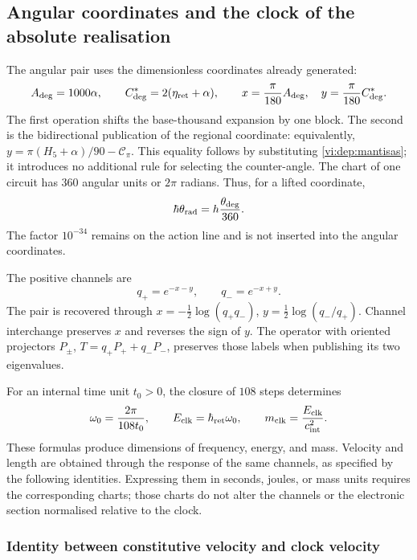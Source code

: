 \subsection{Angular coordinates and the clock of the absolute realisation}
\label{vi:dep:reloj}

The angular pair uses the dimensionless coordinates already generated:
\begin{equation}
 A_{\deg}=1000\alpha,\qquad
 C^*_{\deg}=2(\eta_{\rm ret}+\alpha),\qquad
 x=\frac{\pi}{180}A_{\deg},\quad
 y=\frac{\pi}{180}C^*_{\deg}.
 \label{vi:dep:angulos}
\end{equation}
The first operation shifts the base-thousand expansion by one block.
The second is the bidirectional publication of the regional coordinate:
equivalently,
\(y=\pi(H_5+\alpha)/90-\mathcal C_\pi\).
This equality follows by substituting \eqref{vi:dep:mantisas}; it
introduces no additional rule for selecting the counter-angle.
The chart of one circuit has \(360\) angular units or \(2\pi\)
radians. Thus, for a lifted coordinate,
\[
 \hbar\theta_{\rm rad}
 =h\frac{\theta_{\deg}}{360}.
\]
The factor \(10^{-34}\) remains on the action line and is not
inserted into the angular coordinates.

The positive channels are
\[
 q_+=e^{-x-y},\qquad q_-=e^{-x+y}.
\]
The pair is recovered through
\(x=-\tfrac12\log(q_+q_-)\),
\(y=\tfrac12\log(q_-/q_+)\). Channel interchange preserves
\(x\) and reverses the sign of \(y\). The operator with oriented
projectors \(P_\pm\),
\(T=q_+P_++q_-P_-\), preserves those labels when publishing its two
eigenvalues.

For an internal time unit \(t_0>0\), the closure of \(108\)
steps determines
\begin{equation}
 \omega_0=\frac{2\pi}{108t_0},\qquad
 E_{\rm clk}=\hbar_{\rm ret}\omega_0,
 \qquad m_{\rm clk}=\frac{E_{\rm clk}}{c_{\rm int}^{2}}.
 \label{vi:dep:reloj-absoluto}
\end{equation}
These formulas produce dimensions of frequency, energy, and mass.
Velocity and length are obtained through the response of the
same channels, as specified by the following identities. Expressing them
in seconds, joules, or mass units requires the corresponding
charts; those charts do not alter the channels or the electronic
section normalised relative to the clock.

\subsubsection{Identity between constitutive velocity and clock velocity}

